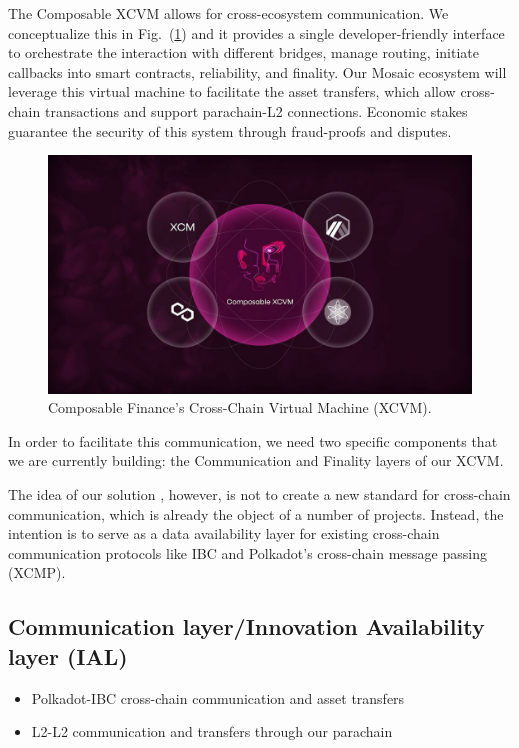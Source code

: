 The Composable XCVM allows for cross-ecosystem communication. We conceptualize this in Fig.~(\ref{fig:xcvm}) and it provides a single developer-friendly interface to orchestrate the interaction with different bridges, manage routing, initiate callbacks into smart contracts, reliability, and finality. Our Mosaic ecosystem will leverage this virtual machine to facilitate the asset transfers, which allow cross-chain transactions and support parachain-L2 connections. Economic stakes guarantee the security of this system through fraud-proofs and disputes.
%
\begin{figure}
    \centering
    \includegraphics[width=15cm]{images/xcvm.jpg}
    \caption{Composable Finance's Cross-Chain Virtual Machine (XCVM).}
    \label{fig:xcvm}
\end{figure}
%
In order to facilitate this communication, we need two specific components that we are currently building: the Communication and Finality layers of our XCVM.

The idea of our solution , however, is not to create a new standard for cross-chain communication, which is already the object of a number of projects. Instead, the intention is to serve as a data availability layer for existing cross-chain communication protocols like IBC and Polkadot’s cross-chain message passing (XCMP).

\subsection{Communication layer/Innovation Availability layer (IAL)}
\begin{itemize}
    \item Polkadot-IBC cross-chain communication and asset transfers
    \item L2-L2 communication and transfers through our parachain
\end{itemize}
    

